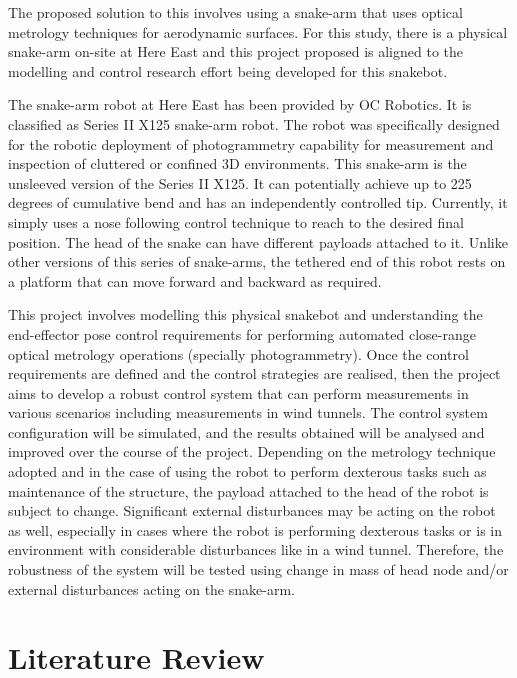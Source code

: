 \documentclass[a4paper,12pt]{report}
\begin{document}
The proposed solution to this involves using a snake-arm that uses optical metrology techniques for aerodynamic surfaces. For this study, there is a physical snake-arm on-site at Here East and this project proposed is aligned to the modelling and control research effort being developed for this snakebot.

The snake-arm robot at Here East has been provided by OC Robotics. It is classified as Series II X125 snake-arm robot. The robot was specifically designed for the robotic deployment of photogrammetry capability for measurement and inspection of cluttered or confined 3D environments. This snake-arm is the unsleeved version of the Series II X125. It can potentially achieve up to 225 degrees of cumulative bend \cite{OCRobotics_Series_II_Webpage} and has an independently controlled tip. Currently, it simply uses a nose following control technique to reach to the desired final position.  The head of the snake can have different payloads attached to it. Unlike other versions of this series of snake-arms, the tethered end of this robot rests on a platform that can move forward and backward as required.

This project involves modelling this physical snakebot and understanding the end-effector pose control requirements for performing automated close-range optical metrology operations (specially photogrammetry). Once the control requirements are defined and the control strategies are realised, then the project aims to develop a robust control system that can perform measurements in various scenarios including measurements in wind tunnels. The control system configuration will be simulated, and the results obtained will be analysed and improved over the course of the project. Depending on the metrology technique adopted and in the case of using the robot to perform dexterous tasks such as maintenance of the structure, the payload attached to the head of the robot is subject to change. Significant external disturbances may be acting on the robot as well, especially in cases where the robot is performing dexterous tasks or is in environment with considerable disturbances like in a wind tunnel. Therefore, the robustness of the system will be tested using change in mass of head node and/or external disturbances acting on the snake-arm.

\section{Literature Review}
\end{document}
